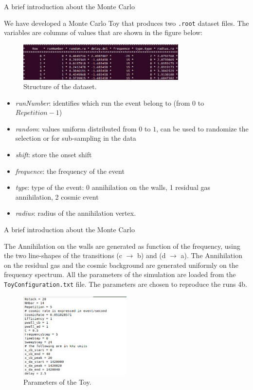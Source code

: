 \documentclass[8pt]{beamer}
\begin{document}
\begin{frame}{A brief introduction about the Monte Carlo}

We have developed a Monte Carlo Toy that produces two \texttt{.root} dataset files. The variables are columns of values that are shown in the figure below:
\begin{figure}[hbtp]
 \centering
 \includegraphics[width = 0.75\textwidth]{DatasetContent.png}
 \caption{ Structure of the dataset.}
 \end{figure}

\begin{itemize}
\item \textit{runNumber}: identifies which run the event belong to (from $0$ to $Repetition -1$) 
\item \textit{random}: values uniform distributed from $0$ to $1$, can be used to randomize the selection or for sub-sampling in the data
\item \textit{shift}: store the onset shift
\item \textit{frequence}: the frequency of the event
\item \textit{type}: type of the event: 0 annihilation on the walls, 1 residual gas annihilation, 2 cosmic event
\item \textit{radius}: radius of the annihilation vertex.
\end{itemize}

\end{frame}

\begin{frame}{A brief introduction about the Monte Carlo}

The Annihilation on the walls are generated as function of the frequency, using the two line-shapes of the transitions (c $\rightarrow$ b) and (d $\rightarrow$ a). The Annihilation on the residual gas and the cosmic background are generated uniformly on the frequency spectrum. All the parameters of the simulation are loaded from the \texttt{ToyConfiguration.txt} file. The parameters are chosen to reproduce the runs 4b.

\begin{figure}[hbtp]
\centering
\includegraphics[width = 0.5\textwidth]{MontecarloParams.png}
\caption{ Parameters of the Toy.}
\end{figure}
\end{frame}
\end{document}
